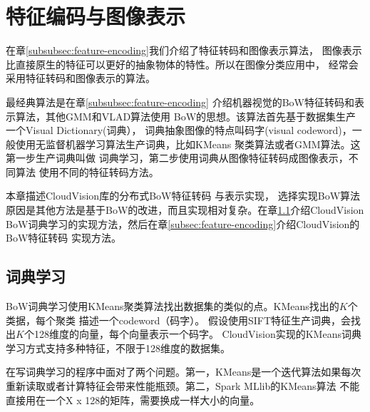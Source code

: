 \section{特征编码与图像表示}
\label{sec:image-representation}
在章\ref{subsubsec:feature-encoding}我们介绍了特征转码和图像表示算法，
图像表示比直接原生的特征可以更好的抽象物体的特性。所以在图像分类应用中，
经常会采用特征转码和图像表示的算法。

最经典算法是在章\ref{subsubsec:feature-encoding}
介绍机器视觉的BoW特征转码和表示算法，其他GMM和VLAD算法使用
BoW的思想。该算法首先基于数据集生产一个Visual Dictionary(词典），
词典抽象图像的特点叫码字(visual codeword)，一般使用无监督机器学习算法生产词典，比如KMeans
聚类算法或者GMM算法。这第一步生产词典叫做
词典学习，第二步使用词典从图像特征转码成图像表示，不同算法
使用不同的特征转码方法。

本章描述CloudVision库的分布式BoW特征转码
与表示实现，
选择实现BoW算法原因是其他方法是基于BoW的改进，而且实现相对复杂。在章\ref{subsec:dict-learning}介绍CloudVision
BoW词典学习的实现方法，然后在章\ref{subsec:feature-encoding}介绍CloudVision的BoW特征转码
实现方法。

\subsection{词典学习}
\label{subsec:dict-learning}
BoW词典学习使用KMeans聚类算法找出数据集的类似的点。KMeans找出的$K$个类据，每个聚类
描述一个codeword（码字）。
假设使用SIFT特征生产词典，会找出$K$个128维度的向量，每个向量表示一个码字。
CloudVision实现的KMeans词典学习方式支持多种特征，不限于128维度的数据集。

在写词典学习的程序中面对了两个问题。第一，KMeans是一个迭代算法如果每次
重新读取或者计算特征会带来性能瓶颈。第二，Spark MLlib的KMeans算法
不能直接用在一个X x 128的矩阵，需要换成一样大小的向量。

